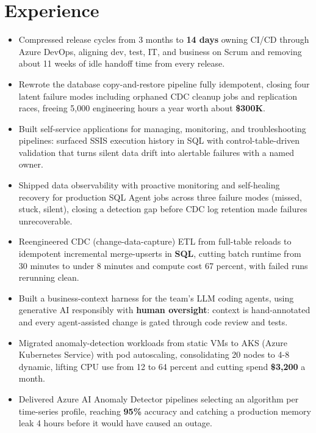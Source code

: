 \documentclass[letterpaper,10pt]{article}
\begin{document}
\section{Experience}
\begin{itemize}
\item Compressed release cycles from 3 months to \textbf{14 days} owning CI/CD through Azure DevOps, aligning dev, test, IT, and business on Scrum and removing about 11 weeks of idle handoff time from every release.
\item Rewrote the database copy-and-restore pipeline fully idempotent, closing four latent failure modes including orphaned CDC cleanup jobs and replication races, freeing 5,000 engineering hours a year worth about \textbf{\$300K}.
\item Built self-service applications for managing, monitoring, and troubleshooting pipelines: surfaced SSIS execution history in SQL with control-table-driven validation that turns silent data drift into alertable failures with a named owner.
\item Shipped data observability with proactive monitoring and self-healing recovery for production SQL Agent jobs across three failure modes (missed, stuck, silent), closing a detection gap before CDC log retention made failures unrecoverable.
\item Reengineered CDC (change-data-capture) ETL from full-table reloads to idempotent incremental merge-upserts in \textbf{SQL}, cutting batch runtime from 30 minutes to under 8 minutes and compute cost 67 percent, with failed runs rerunning clean.
\item Built a business-context harness for the team's LLM coding agents, using generative AI responsibly with \textbf{human oversight}: context is hand-annotated and every agent-assisted change is gated through code review and tests.
\end{itemize}

\begin{itemize}
\item Migrated anomaly-detection workloads from static VMs to AKS (Azure Kubernetes Service) with pod autoscaling, consolidating 20 nodes to 4-8 dynamic, lifting CPU use from 12 to 64 percent and cutting spend \textbf{\$3,200} a month.
\item Delivered Azure AI Anomaly Detector pipelines selecting an algorithm per time-series profile, reaching \textbf{95\%} accuracy and catching a production memory leak 4 hours before it would have caused an outage.
\end{itemize}
\end{document}
